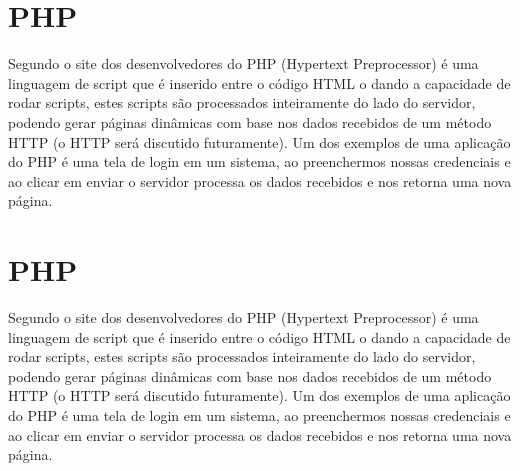 \section{PHP}
\label{subsec: php}

Segundo o site dos desenvolvedores do PHP (Hypertext Preprocessor) é uma linguagem de script que é inserido entre o código HTML o dando a capacidade de rodar scripts, estes scripts são processados inteiramente do lado do servidor, podendo gerar páginas dinâmicas com base nos dados recebidos de um método HTTP (o HTTP será discutido futuramente). Um dos exemplos de uma aplicação do PHP é uma tela de login em um sistema, ao preenchermos nossas credenciais e ao clicar em enviar o servidor processa os dados recebidos e nos retorna uma nova página.

\section{PHP}
\label{subsec: php}

Segundo o site dos desenvolvedores do PHP (Hypertext Preprocessor) é uma linguagem de script que é inserido entre o código HTML o dando a capacidade de rodar scripts, estes scripts são processados inteiramente do lado do servidor, podendo gerar páginas dinâmicas com base nos dados recebidos de um método HTTP (o HTTP será discutido futuramente). Um dos exemplos de uma aplicação do PHP é uma tela de login em um sistema, ao preenchermos nossas credenciais e ao clicar em enviar o servidor processa os dados recebidos e nos retorna uma nova página.

